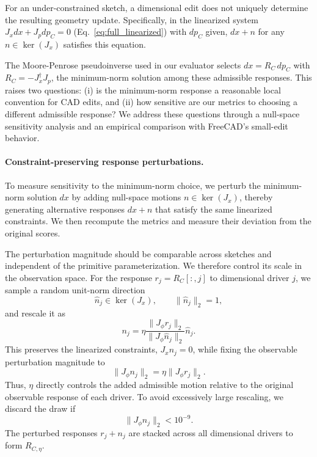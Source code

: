 For an under-constrained sketch, a dimensional edit does not uniquely determine the resulting geometry update.
Specifically, in the linearized system $J_x dx + J_p dp_C = 0$ (Eq.~\ref{eq:full_linearized}) with $dp_C$ given, $dx + n$ for any $n \in \ker(J_x)$ satisfies this equation.

The Moore-Penrose pseudoinverse used in our evaluator selects $dx = R_C\,dp_C$ with $R_C=-J_x^\dagger J_p$, the minimum-norm solution among these admissible responses. This raises two questions: (i) is the minimum-norm response a reasonable local convention for CAD edits, and (ii) how sensitive are our metrics to choosing a different admissible response? We address these questions through a null-space sensitivity analysis and an empirical comparison with FreeCAD's small-edit behavior.

\paragraph{Constraint-preserving response perturbations.}
To measure sensitivity to the minimum-norm choice, we perturb the minimum-norm solution $dx$ by adding null-space motions $n\in\ker(J_x)$, thereby generating alternative responses $dx+n$ that satisfy the same linearized constraints. We then recompute the metrics and measure their deviation from the original scores.

The perturbation magnitude should be comparable across sketches and independent of the primitive parameterization. We therefore control its scale in the observation space. For the response $r_j=R_C[:,j]$ to dimensional driver $j$, we sample a random unit-norm direction
\begin{equation}
\hat{n}_j\in\ker(J_x),\qquad \|\hat{n}_j\|_2=1,
\end{equation}
and rescale it as
\begin{equation}
n_j
=
\eta
\frac{\|J_\phi r_j\|_2}
     {\|J_\phi \hat{n}_j\|_2}
\hat{n}_j .
\end{equation}
This preserves the linearized constraints, $J_x n_j=0$, while fixing the observable perturbation magnitude to
\begin{equation}
\|J_\phi n_j\|_2
=
\eta\|J_\phi r_j\|_2.
\end{equation}
Thus, $\eta$ directly controls the added admissible motion relative to the original observable response of each driver. To avoid excessively large rescaling, we discard the draw if
\begin{equation}
\|J_\phi \hat{n}_j\|_2 < 10^{-9}.
\end{equation}
The perturbed responses $r_j+n_j$ are stacked across all dimensional drivers to form $R_{C,\eta}$.

